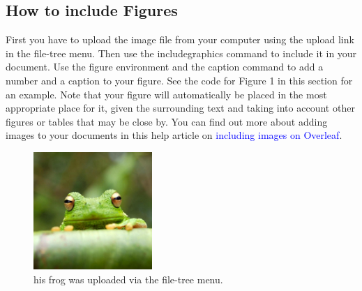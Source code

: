 \documentclass{article} %
\begin{document}
\subsection{How to include Figures}
First you have to upload the image file from your computer using the upload link in the file-tree menu.
Then use the includegraphics command to include it in your document. Use the figure environment
and the caption command to add a number and a caption to your figure. See the code for Figure 1 in this section for an example.
Note that your figure will automatically be placed in the most appropriate place for it, given the surrounding text and taking into account other figures or tables that may be close by. You can find
out more about adding images to your documents in this help article on \textcolor{blue}{including images on Overleaf}.
\begin{figure}
		\centering
		\includegraphics[width=0.4\textwidth]{frog.jpg}
		\caption{his frog was uploaded via the file-tree menu.}
		\label{fig:example}
	\end{figure}
\end{document}
